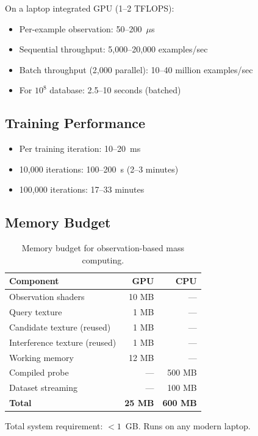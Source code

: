 \documentclass[11pt,twocolumn,a4paper]{article}
\theoremstyle{definition}
\theoremstyle{remark}
\begin{document}
On a laptop integrated GPU (1--2 TFLOPS):
\begin{itemize}[nosep]
\item Per-example observation: 50--200~$\mu$s
\item Sequential throughput: 5,000--20,000 examples/sec
\item Batch throughput (2,000 parallel): 10--40 million examples/sec
\item For $10^8$ database: 2.5--10 seconds (batched)
\end{itemize}

\subsection{Training Performance}

\begin{itemize}[nosep]
\item Per training iteration: 10--20~ms
\item 10,000 iterations: 100--200~s (2--3 minutes)
\item 100,000 iterations: 17--33 minutes
\end{itemize}

\subsection{Memory Budget}

\begin{table}[H]
\centering
\caption{Memory budget for observation-based mass computing.}
\small
\begin{tabular}{lrr}
\toprule
\textbf{Component} & \textbf{GPU} & \textbf{CPU} \\
\midrule
Observation shaders & 10 MB & --- \\
Query texture & 1 MB & --- \\
Candidate texture (reused) & 1 MB & --- \\
Interference texture (reused) & 1 MB & --- \\
Working memory & 12 MB & --- \\
Compiled probe & --- & 500 MB \\
Dataset streaming & --- & 100 MB \\
\midrule
\textbf{Total} & \textbf{25 MB} & \textbf{600 MB} \\
\bottomrule
\end{tabular}
\end{table}

Total system requirement: $< 1$~GB. Runs on any modern laptop.
\end{document}
